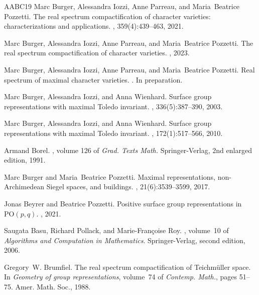 \documentclass{amsart}
\theoremstyle{plain}
\theoremstyle{definition}
\newcommand{\1}{\mathbf{1}}
\begin{document}
\begin{thebibliography}{AABC{\etalchar{+}}19}
Marc Burger, Alessandra Iozzi, Anne Parreau, and Maria~Beatrice Pozzetti.
\newblock The real spectrum compactification of character varieties:
  characterizations and applications.
, 359(4):439--463, 2021.

Marc Burger, Alessandra Iozzi, Anne Parreau, and Maria~Beatrice Pozzetti.
\newblock The real spectrum compactification of character varieties.
, 2023.

Marc Burger, Alessandra Iozzi, Anne Parreau, and Maria~Beatrice Pozzetti.
\newblock Real spectrum of maximal character varieties.
.
\newblock In preparation.

Marc Burger, Alessandra Iozzi, and Anna Wienhard.
\newblock Surface group representations with maximal {T}oledo invariant.
, 336(5):387--390, 2003.

Marc Burger, Alessandra Iozzi, and Anna Wienhard.
\newblock Surface group representations with maximal {Toledo} invariant.
, 172(1):517--566, 2010.

Armand Borel.
, volume 126 of {\em Grad. Texts Math.}
\newblock Springer-Verlag, 2nd enlarged edition, 1991.

Marc Burger and Maria~Beatrice Pozzetti.
\newblock Maximal representations, non-{Archimedean} {Siegel} spaces, and
  buildings.
, 21(6):3539--3599, 2017.

Jonas Beyrer and Beatrice Pozzetti.
\newblock Positive surface group representations in $\textrm{PO}(p,q)$.
, 2021.

Saugata Basu, Richard Pollack, and Marie-Fran\c{c}oise Roy.
, volume~10 of {\em
  Algorithms and Computation in Mathematics}.
\newblock Springer-Verlag, second edition, 2006.

Gregory~W. Brumfiel.
\newblock The real spectrum compactification of {T}eichm\"{u}ller space.
\newblock In {\em Geometry of group representations}, volume~74 of {\em
  Contemp. Math.}, pages 51--75. Amer. Math. Soc., 1988.


\end{thebibliography}
\end{document}
